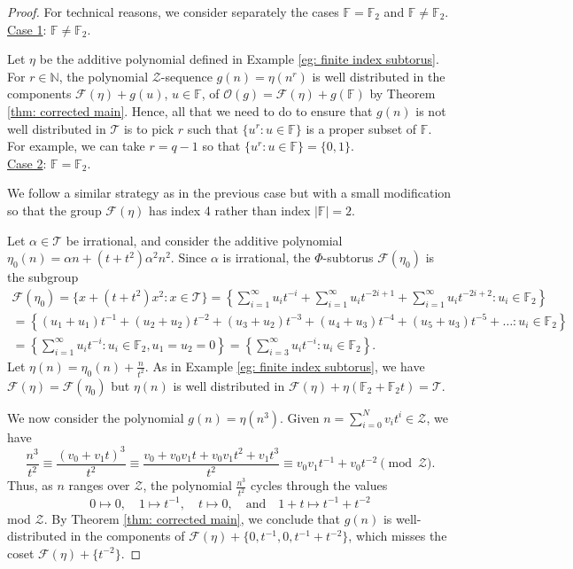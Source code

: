 \documentclass[11pt]{amsart}
\theoremstyle{theorem}
\theoremstyle{definition}
\newcommand{\N}{\mathbb{N}}
\newcommand{\F}{\mathbb{F}}
\newcommand{\mZ}{\mathcal{Z}}
\newcommand{\mT}{\mathcal{T}}
\newcommand{\mF}{\mathcal{F}}
\newcommand{\mO}{\mathcal{O}}
\begin{document}
\begin{proof}
	For technical reasons, we consider separately the cases $\F = \F_2$ and $\F \ne \F_2$. \\
	
	\underline{Case 1}: $\F \ne \F_2$.
	
	Let $\eta$ be the additive polynomial defined in Example \ref{eg: finite index subtorus}.
	For $r \in \N$, the polynomial $\mZ$-sequence $g(n) = \eta(n^r)$ is well distributed in the components $\mF(\eta) + g(u)$, $u \in \F$, of $\mO(g) = \mF(\eta) + g(\F)$ by Theorem \ref{thm: corrected main}.
	Hence, all that we need to do to ensure that $g(n)$ is not well distributed in $\mT$ is to pick $r$ such that $\{u^r : u \in \F\}$ is a proper subset of $\F$.
	For example, we can take $r = q-1$ so that $\{u^r : u \in \F\} = \{0,1\}$. \\
	
	\underline{Case 2}: $\F = \F_2$.
	
	We follow a similar strategy as in the previous case but with a small modification so that the group $\mF(\eta)$ has index 4 rather than index $|\F| = 2$.
	
	Let $\alpha \in \mT$ be irrational, and consider the additive polynomial $\eta_0(n) = \alpha n + (t+t^2) \alpha^2 n^2$.
	Since $\alpha$ is irrational, the $\Phi$-subtorus $\mF(\eta_0)$ is the subgroup
	\begin{multline*}
		\mF(\eta_0) = \{x + (t+t^2)x^2 : x \in \mT\} 
        = \left\{ \sum_{i=1}^{\infty} u_i t^{-i} + \sum_{i=1}^{\infty} u_i t^{-2i+1} + \sum_{i=1}^{\infty} u_i t^{-2i+2} : u_i \in \F_2 \right\} \\
		 = \left\{ (u_1+u_1)t^{-1} + (u_2+u_2)t^{-2} + (u_3+u_2)t^{-3} + (u_4+u_3)t^{-4} + (u_5+u_3)t^{-5} + \ldots : u_i \in \F_2 \right\} \\
		 = \left\{ \sum_{i=1}^{\infty} u_i t^{-i} : u_i \in \F_2, u_1 = u_2 = 0 \right\} = \left\{ \sum_{i=3}^{\infty} u_i t^{-i} : u_i \in \F_2 \right\}.
	\end{multline*}
	Let $\eta(n) = \eta_0(n) + \frac{n}{t^2}$.
	As in Example \ref{eg: finite index subtorus}, we have $\mF(\eta) = \mF(\eta_0)$ but $\eta(n)$ is well distributed in $\mF(\eta) + \eta(\F_2 + \F_2 t) = \mT$.
	
	We now consider the polynomial $g(n) = \eta(n^3)$.
	Given $n = \sum_{i=0}^N v_i t^i \in \mZ$, we have
	\begin{equation*}
		\frac{n^3}{t^2} \equiv \frac{(v_0 + v_1t)^3}{t^2} \equiv \frac{v_0 + v_0v_1t + v_0v_1t^2 + v_1t^3}{t^2} \equiv v_0v_1 t^{-1} + v_0 t^{-2} \pmod{\mZ}.
	\end{equation*}
	Thus, as $n$ ranges over $\mZ$, the polynomial $\frac{n^3}{t^2}$ cycles through the values
	\begin{equation*}
		0 \mapsto 0, \quad 1 \mapsto t^{-1}, \quad t \mapsto 0, \quad \text{and} \quad 1+t \mapsto t^{-1} + t^{-2}
	\end{equation*}
	mod $\mZ$.
	By Theorem \ref{thm: corrected main}, we conclude that $g(n)$ is well-distributed in the components of $\mF(\eta) + \{0, t^{-1}, 0, t^{-1} + t^{-2}\}$, which misses the coset $\mF(\eta) + \{t^{-2}\}$.
\end{proof}
\end{document}
